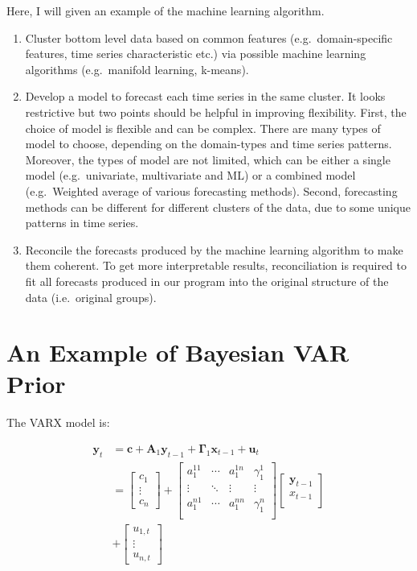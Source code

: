 \documentclass{monashthesis}
\begin{document}
Here, I will given an example of the machine learning algorithm.

\begin{enumerate}
\def\labelenumi{\arabic{enumi}.}
\item
  Cluster bottom level data based on common features (e.g.~domain-specific features, time series characteristic etc.) via possible machine learning algorithms (e.g.~manifold learning, k-means).
\item
  Develop a model to forecast each time series in the same cluster. It looks restrictive but two points should be helpful in improving flexibility. First, the choice of model is flexible and can be complex. There are many types of model to choose, depending on the domain-types and time series patterns. Moreover, the types of model are not limited, which can be either a single model (e.g.~univariate, multivariate and ML) or a combined model (e.g.~Weighted average of various forecasting methods). Second, forecasting methods can be different for different clusters of the data, due to some unique patterns in time series.
\item
  Reconcile the forecasts produced by the machine learning algorithm to make them coherent. To get more interpretable results, reconciliation is required to fit all forecasts produced in our program into the original structure of the data (i.e.~original groups).
\end{enumerate}

\appendix

\hypertarget{an-example-of-bayesian-var-prior}{%
\chapter{An Example of Bayesian VAR Prior}\label{an-example-of-bayesian-var-prior}}

The VARX model is:

\[
\begin{aligned}
\bm{y}_t&=\bm{c}+\bm{A}_1 \bm{y}_{t-1}+\bm{\Gamma}_1\bm{x}_{t-1}+\bm{u}_t\\
&=
\begin{bmatrix}
c_1\\
\vdots\\
c_n
\end{bmatrix}
+
\begin{bmatrix}
a_1^{11}&\cdots&a_1^{1n}&\gamma_1^{1}\\
\vdots&\ddots&\vdots&\vdots\\
a_1^{n1}&\cdots&a_1^{nn}&\gamma_1^n\\
\end{bmatrix}
\begin{bmatrix}
\bm{y}_{t-1}\\
x_{t-1}\\
\end{bmatrix}\\
&+
\begin{bmatrix}
u_{1,t}\\
\vdots\\
u_{n,t}
\end{bmatrix}\\
\end{aligned}
\]
\end{document}
